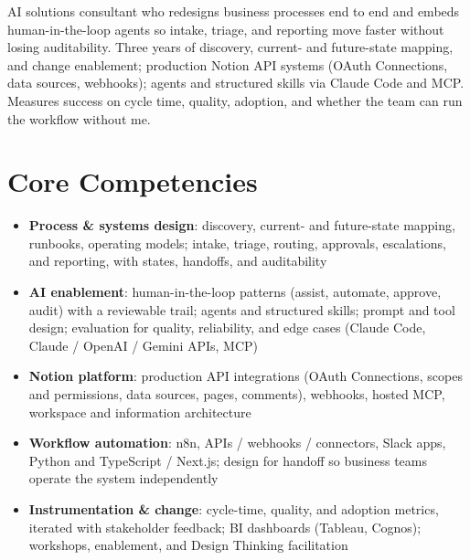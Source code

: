 \documentclass[11pt,a4paper,sans]{moderncv}
\begin{document}
\makecvtitle


\vspace{6pt}
\small{AI solutions consultant who redesigns business processes end to end and embeds human-in-the-loop agents so intake, triage, and reporting move faster without losing auditability. Three years of discovery, current- and future-state mapping, and change enablement; production Notion API systems (OAuth Connections, data sources, webhooks); agents and structured skills via Claude Code and MCP. Measures success on cycle time, quality, adoption, and whether the team can run the workflow without me.}


\section{Core Competencies}
\vspace{1pt}
\begin{itemize}

\item \textbf{Process \& systems design}: discovery, current- and future-state mapping, runbooks, operating models; intake, triage, routing, approvals, escalations, and reporting, with states, handoffs, and auditability

\item \textbf{AI enablement}: human-in-the-loop patterns (assist, automate, approve, audit) with a reviewable trail; agents and structured skills; prompt and tool design; evaluation for quality, reliability, and edge cases (Claude Code, Claude / OpenAI / Gemini APIs, MCP)

\item \textbf{Notion platform}: production API integrations (OAuth Connections, scopes and permissions, data sources, pages, comments), webhooks, hosted MCP, workspace and information architecture

\item \textbf{Workflow automation}: n8n, APIs / webhooks / connectors, Slack apps, Python and TypeScript / Next.js; design for handoff so business teams operate the system independently

\item \textbf{Instrumentation \& change}: cycle-time, quality, and adoption metrics, iterated with stakeholder feedback; BI dashboards (Tableau, Cognos); workshops, enablement, and Design Thinking facilitation

\end{itemize}
\end{document}
